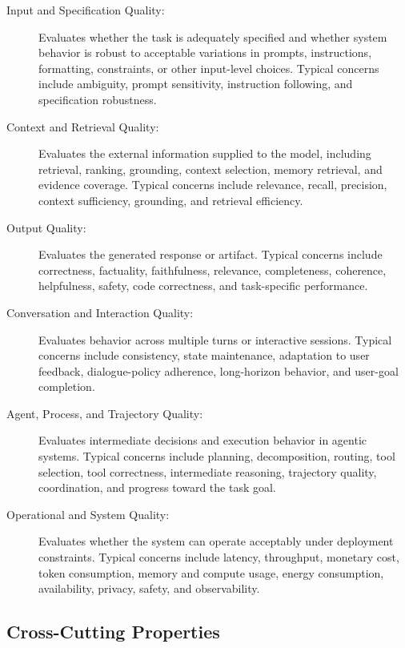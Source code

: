 \begin{description}

\item[Input and Specification Quality:]
Evaluates whether the task is adequately specified and whether system behavior is robust to acceptable variations in prompts, instructions, formatting, constraints, or other input-level choices. Typical concerns include ambiguity, prompt sensitivity, instruction following, and specification robustness.

\item[Context and Retrieval Quality:]
Evaluates the external information supplied to the model, including retrieval, ranking, grounding, context selection, memory retrieval, and evidence coverage. Typical concerns include relevance, recall, precision, context sufficiency, grounding, and retrieval efficiency.

\item[Output Quality:]
Evaluates the generated response or artifact. Typical concerns include correctness, factuality, faithfulness, relevance, completeness, coherence, helpfulness, safety, code correctness, and task-specific performance.

\item[Conversation and Interaction Quality:]
Evaluates behavior across multiple turns or interactive sessions. Typical concerns include consistency, state maintenance, adaptation to user feedback, dialogue-policy adherence, long-horizon behavior, and user-goal completion.

\item[Agent, Process, and Trajectory Quality:]
Evaluates intermediate decisions and execution behavior in agentic systems. Typical concerns include planning, decomposition, routing, tool selection, tool correctness, intermediate reasoning, trajectory quality, coordination, and progress toward the task goal.

\item[Operational and System Quality:]
Evaluates whether the system can operate acceptably under deployment constraints. Typical concerns include latency, throughput, monetary cost, token consumption, memory and compute usage, energy consumption, availability, privacy, safety, and observability.

\end{description}

\subsection{Cross-Cutting Properties}


